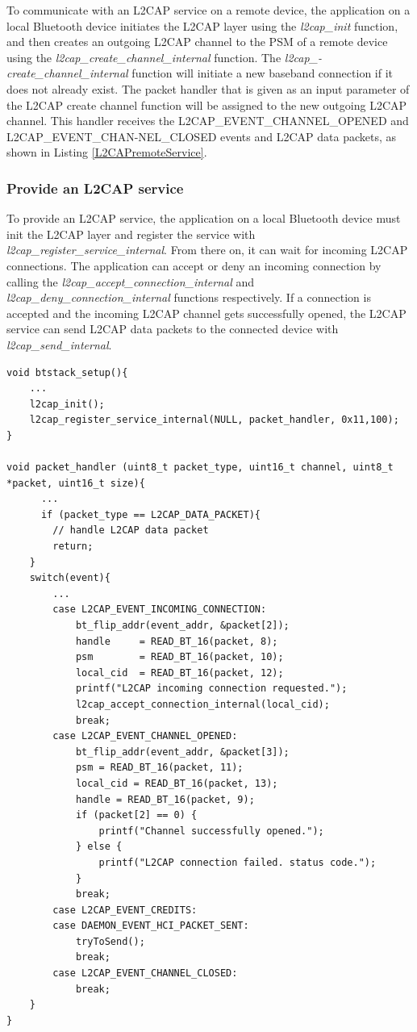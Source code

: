 To communicate with an L2CAP service on a remote device, the application on a local Bluetooth device initiates the L2CAP layer using the \emph{l2cap\_init} function, and then creates an outgoing L2CAP channel to the PSM of a remote device using the \emph{l2cap\_create\_channel\_internal} function. The  \emph{l2cap\_-create\_channel\_internal} function will initiate a new baseband connection if it does not already exist. The packet handler that is given as an input parameter of the L2CAP create channel function will be assigned to the new outgoing L2CAP channel. This handler receives the L2CAP\_EVENT\_CHANNEL\_OPENED and L2CAP\_EVENT\_CHAN-NEL\_CLOSED events and L2CAP data packets, as shown in Listing \ref{L2CAPremoteService}.


\subsubsection{Provide an L2CAP service}

To provide an L2CAP service, the application on a local Bluetooth device must init the L2CAP layer and register the service with \emph{l2cap\_register\_service\_internal}. From there on, it can wait for incoming L2CAP connections. The application can accept or deny an incoming connection by calling the \emph{l2cap\_accept\_connection\_internal} and \emph{l2cap\_deny\_connection\_internal} functions respectively. If a connection is accepted and the incoming L2CAP channel gets successfully opened, the L2CAP service can send L2CAP data packets to the connected device with \emph{l2cap\_send\_internal}. 

\begin{lstlisting}[caption=Providing an L2CAP service., label=L2CAPService]
void btstack_setup(){
    ...
    l2cap_init();
    l2cap_register_service_internal(NULL, packet_handler, 0x11,100);
}

void packet_handler (uint8_t packet_type, uint16_t channel, uint8_t *packet, uint16_t size){
      ...
      if (packet_type == L2CAP_DATA_PACKET){
        // handle L2CAP data packet
        return;
    }
    switch(event){
        ...
        case L2CAP_EVENT_INCOMING_CONNECTION:
            bt_flip_addr(event_addr, &packet[2]);
            handle     = READ_BT_16(packet, 8); 
            psm        = READ_BT_16(packet, 10); 
            local_cid  = READ_BT_16(packet, 12); 
            printf("L2CAP incoming connection requested.");
            l2cap_accept_connection_internal(local_cid);
            break;
        case L2CAP_EVENT_CHANNEL_OPENED:
            bt_flip_addr(event_addr, &packet[3]);
            psm = READ_BT_16(packet, 11); 
            local_cid = READ_BT_16(packet, 13); 
            handle = READ_BT_16(packet, 9);
            if (packet[2] == 0) {
                printf("Channel successfully opened.");
            } else {
                printf("L2CAP connection failed. status code.");
            }
            break;        
        case L2CAP_EVENT_CREDITS:
        case DAEMON_EVENT_HCI_PACKET_SENT:
            tryToSend();
            break;
        case L2CAP_EVENT_CHANNEL_CLOSED:
            break;
    }
}
\end{lstlisting}


